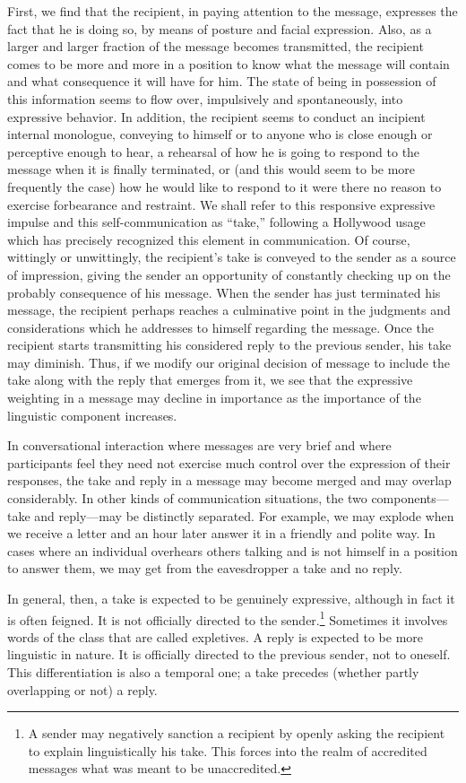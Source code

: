 \documentclass[twoside,symmetric,nobib,justified]{tufte-book}
\begin{document}
First, we find that the recipient, in paying attention to the message,
expresses the fact that he is doing so, by means of posture and facial
expression. Also, as a larger and larger fraction of the message becomes
transmitted, the recipient comes to be more and more in a position to
know what the message will contain and what consequence it will have for
him. The state of being in possession of this information seems to flow
over, impulsively and spontaneously, into expressive behavior. In
addition, the recipient seems to conduct an incipient internal
monologue, conveying to himself or to anyone who is close enough or
perceptive enough to hear, a rehearsal of how he is going to respond to
the message when it is finally terminated, or (and this would seem to be
more frequently the case) how he would like to respond to it were there
no reason to exercise forbearance and restraint. We shall refer to this
responsive expressive impulse and this self-communication as ``take,''
following a Hollywood usage which has precisely recognized this element
in communication. Of course, wittingly or unwittingly, the recipient's
take is conveyed to the sender as a source of impression, giving the
sender an opportunity of constantly checking up on the probably
consequence of his message. When the sender has just terminated his
message, the recipient perhaps reaches a culminative point in the
judgments and considerations which he addresses to himself regarding the
message. Once the recipient starts transmitting his considered reply to
the previous sender, his take may diminish. Thus, if we modify our
original decision of message to include the take along with the reply
that emerges from it, we see that the expressive weighting in a message
may decline in importance as the importance of the linguistic component
increases.

In conversational interaction where messages are very brief and where
participants feel they need not exercise much control over the
expression of their responses, the take and reply in a message may
become merged and may overlap considerably. In other kinds of
communication situations, the two components---take and reply---may be
distinctly separated. For example, we may explode when we receive a
letter and an hour later answer it in a friendly and polite way. In
cases where an individual overhears others talking and is not himself in
a position to answer them, we may get from the eavesdropper a take and
no reply.

In general, then, a take is expected to be genuinely expressive,
although in fact it is often feigned. It is not officially directed to
the sender.\footnote{A sender may negatively sanction a recipient by
  openly asking the recipient to explain linguistically his take. This
  forces into the realm of accredited messages what was meant to be
  unaccredited.} Sometimes it involves words of the class that are
called expletives. A reply is expected to be more linguistic in nature.
It is officially directed to the previous sender, not to oneself. This
differentiation is also a temporal one; a take precedes (whether partly
overlapping or not) a reply.
\end{document}
